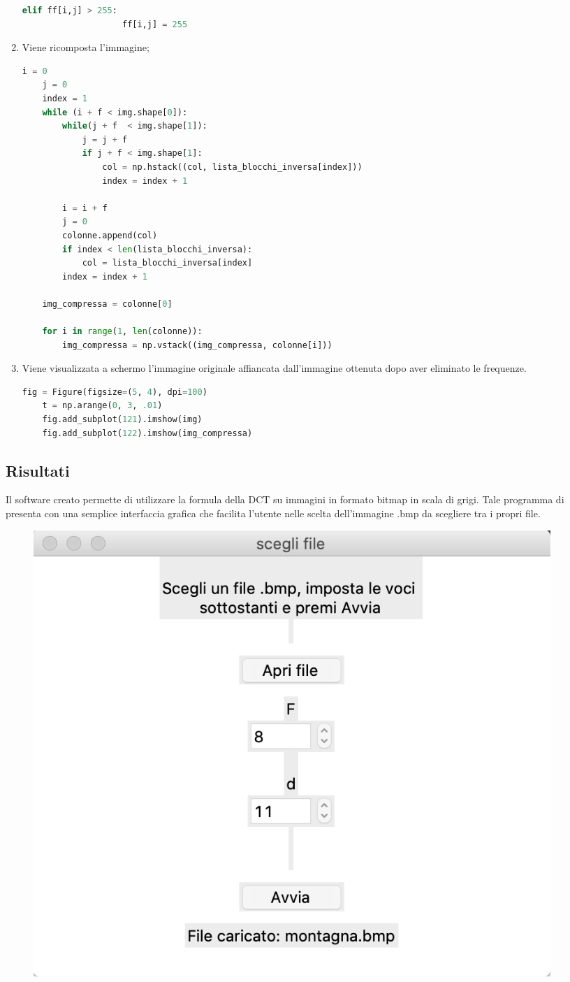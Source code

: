 \documentclass[preprint,12pt]{elsarticle}
\begin{document}
\begin{description}
\begin{enumerate}
\begin{lstlisting}[language=Python]
                elif ff[i,j] > 255:
                    ff[i,j] = 255
\end{lstlisting}

\item Viene ricomposta l'immagine;
\begin{lstlisting}[language=Python]
    i = 0
    j = 0
    index = 1
    while (i + f < img.shape[0]):
        while(j + f  < img.shape[1]):
            j = j + f
            if j + f < img.shape[1]:
                col = np.hstack((col, lista_blocchi_inversa[index]))
                index = index + 1

        i = i + f
        j = 0
        colonne.append(col)
        if index < len(lista_blocchi_inversa):
            col = lista_blocchi_inversa[index]
        index = index + 1

    img_compressa = colonne[0]

    for i in range(1, len(colonne)):
        img_compressa = np.vstack((img_compressa, colonne[i]))
\end{lstlisting}

\item Viene visualizzata a schermo l'immagine originale affiancata dall'immagine ottenuta dopo aver eliminato le frequenze.
\begin{lstlisting}[language=Python]    
    fig = Figure(figsize=(5, 4), dpi=100)
    t = np.arange(0, 3, .01)
    fig.add_subplot(121).imshow(img)
    fig.add_subplot(122).imshow(img_compressa)
\end{lstlisting}

\end{enumerate}

\newpage

\subsection{Risultati}
Il software creato permette di utilizzare la formula della DCT su immagini in formato bitmap in scala di grigi.
Tale programma di presenta con una semplice interfaccia grafica che facilita l'utente nelle scelta dell'immagine .bmp da scegliere tra i propri file.

\begin{figure}[H]
	\centering
	\includegraphics[width=0.5\linewidth]{gui}
\end{figure}


\end{description}
\end{document}
